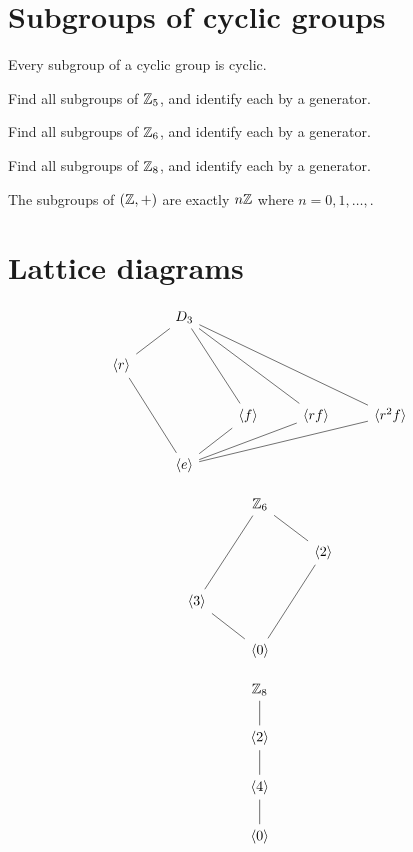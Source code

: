 \documentclass{ximera}
\begin{document}
\section{Subgroups of cyclic groups}


\begin{theorem}
  Every subgroup of a cyclic group is cyclic.
\end{theorem}

\begin{exercsie}
  Find all subgroups of $\mathbb Z_5$, and identify each by a generator.
\end{exercsie}

\begin{exercsie}
  Find all subgroups of $\mathbb Z_6$, and identify each by a generator.
\end{exercsie}

\begin{exercsie}
  Find all subgroups of $\mathbb Z_8$, and identify each by a generator.
\end{exercsie}

  
\begin{corollary}
  The subgroups of $(\mathbb Z,+)$ are exactly $n\mathbb Z$ where $n = 0,1,\dots,$.
\end{corollary}


\section{Lattice diagrams}

\[
\begin{tikzcd}
       & D_3 \ar[rdd,-]\ar[rrdd,-]\ar[rrrdd,-]  \ar[ld,-] & & &      \\
 \<r\> \ar[rdd,-]       &       &  & &  \\
       &       &  \< f\> \ar[ld,-]   &  \< rf\> \ar[lld,-]       &  \< r^2f\> \ar[llld,-]        \\   
       & \<e\> & & &
\end{tikzcd}
\]

\[
\begin{tikzcd}
       & \Z_6 \ar[rd,-]  \ar[ldd,-] &       \\
       &       & \<2\> \ar[ldd,-]\\
\< 3\> \ar[rd,-]&       &       \\   
       & \<0\> &
\end{tikzcd}
\]

\[
\begin{tikzcd}
  \Z_8  \ar[d,-] \\
  \<2\> \ar[d,-] \\
  \<4\> \ar[d,-] \\   
  \<0\> 
\end{tikzcd}
\]
\end{document}
